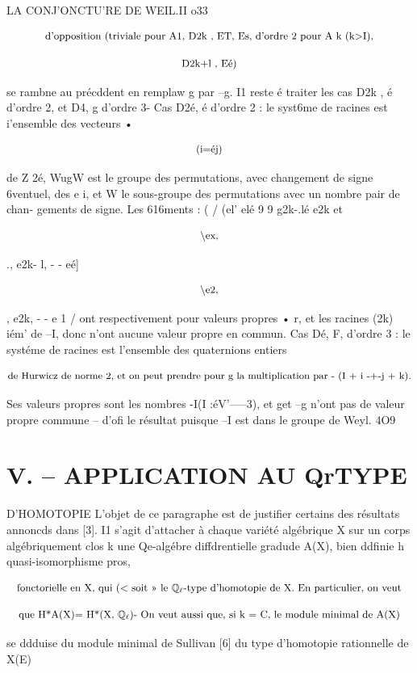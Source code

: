 \documentclass[11pt]{article}
\theoremstyle{remark}
\begin{document}
LA CONJ'ONCTU'RE DE WEIL.II o33

\[\text{\small d'opposition (triviale pour A1, D2k , ET, Es, d'ordre 2 pour A k (k>I),}\]

\[\text{\small D2k+l , Eé)}\]

se rambne au précddent en remplaw g par --g. I1 reste é traiter les cas D2k , é d'ordre 2, et D4, g d'ordre 3- Cas D2é, é d'ordre 2 : le syst6me de racines est i'ensemble des vecteurs •

\[\text{\small (i=éj)}\]

de Z 2é, WugW est le groupe des permutations, avec changement de signe 6ventuel, des e i, et W le sous-groupe des permutations avec un nombre pair de chan- gements de signe. Les 616ments : ( / (el' elé  9  9 g2k-.lé e2k et

\[\text{\small \textbackslash{}ex,}\]

., e2k- l, - - eé]

\[\text{\small \textbackslash{}e2,}\]

, e2k, - - e 1 / ont respectivement pour valeurs propres • r, et les racines (2k) iém' de --I, donc n'ont aucune valeur propre en commun. Cas Dé, F, d'ordre 3 : le systéme de racines est l'ensemble des quaternions entiers

\[\text{\small de Hurwicz de norme 2, et on peut prendre pour g la multiplication par - (I + i -+-j + k).}\]

Ses valeurs propres sont les nombres -I(I :éV'-----3), et get --g n'ont pas de valeur propre commune -- d'ofi le résultat puisque --I est dans le groupe de Weyl. 4O9

\section*{V. -- APPLICATION AU QrTYPE}

D'HOMOTOPIE L'objet de ce paragraphe est de justifier certains des résultats annoncds dans [3]. I1 s'agit d'attacher à chaque variété algébrique X sur un corps algébriquement clos k une Qe-algébre diffdrentielle gradude A(X), bien ddfinie h quasi-isomorphisme pros,

\[\text{\small fonctorielle en X, qui (< soit >> le \(\mathbb{Q}_{\ell}\)-type d'homotopie de X. En particulier, on veut}\]

\[\text{\small que H*A(X)= H*(X, \(\mathbb{Q}_{\ell}\))- On veut aussi que, si k = C, le module minimal de A(X)}\]

se ddduise du module minimal de Sullivan [6] du type d'homotopie rationnelle de X(E)
\end{document}
